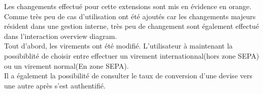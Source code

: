 Les changements effectué pour cette extensions sont mis en évidence en orange.\\
Comme très peu de cas d'utilisation ont été ajoutés car les changements majeurs résident dans une gestion interne, très peu de changement sont également effectué dans l'interaction overview diagram.\\
Tout d'abord, les virements ont été modifié. L'utilisateur à maintenant la possibiblité de choisir entre effectuer un virement internationnal(hors zone SEPA) ou un virement normal(En zone SEPA).\\
Il a également la possibilité de consulter le taux de conversion d'une devise vers une autre après s'est authentifié.
